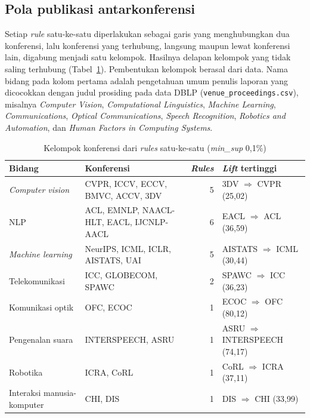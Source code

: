 \subsection{Pola publikasi antarkonferensi}
\label{sec:hasil-t5-pola}
Setiap \textit{rule} satu-ke-satu diperlakukan sebagai garis yang menghubungkan dua konferensi, lalu konferensi yang terhubung, langsung maupun lewat konferensi lain, digabung menjadi satu kelompok. Hasilnya delapan kelompok yang tidak saling terhubung (Tabel~\ref{tab:t5-kelompok}). Pembentukan kelompok berasal dari data. Nama bidang pada kolom pertama adalah pengetahuan umum penulis laporan yang dicocokkan dengan judul prosiding pada data DBLP (\texttt{venue\_proceedings.csv}), misalnya \textit{Computer Vision}, \textit{Computational Linguistics}, \textit{Machine Learning}, \textit{Communications}, \textit{Optical Communications}, \textit{Speech Recognition}, \textit{Robotics and Automation}, dan \textit{Human Factors in Computing Systems}.

\begin{table}[ht]
\caption{Kelompok konferensi dari \textit{rules} satu-ke-satu (\textit{min\_sup} 0,1\%)}
\label{tab:t5-kelompok}
\small
\begin{tabularx}{\textwidth}{@{}l>{\raggedright\arraybackslash}Xr>{\raggedright\arraybackslash}p{3.6cm}@{}}
\toprule
\textbf{Bidang} & \textbf{Konferensi} & \textbf{\textit{Rules}} & \textbf{\textit{Lift} tertinggi} \\
\midrule
\textit{Computer vision} & CVPR, ICCV, ECCV, BMVC, ACCV, 3DV & 5 & 3DV $\Rightarrow$ CVPR (25,02) \\
NLP & ACL, EMNLP, NAACL-HLT, EACL, IJCNLP-AACL & 6 & EACL $\Rightarrow$ ACL (36,59) \\
\textit{Machine learning} & NeurIPS, ICML, ICLR, AISTATS, UAI & 5 & AISTATS $\Rightarrow$ ICML (30,44) \\
Telekomunikasi & ICC, GLOBECOM, SPAWC & 2 & SPAWC $\Rightarrow$ ICC (36,23) \\
Komunikasi optik & OFC, ECOC & 1 & ECOC $\Rightarrow$ OFC (80,12) \\
Pengenalan suara & INTERSPEECH, ASRU & 1 & ASRU $\Rightarrow$ INTERSPEECH (74,17) \\
Robotika & ICRA, CoRL & 1 & CoRL $\Rightarrow$ ICRA (37,11) \\
Interaksi manusia-komputer & CHI, DIS & 1 & DIS $\Rightarrow$ CHI (33,99) \\
\bottomrule
\end{tabularx}
\end{table}

